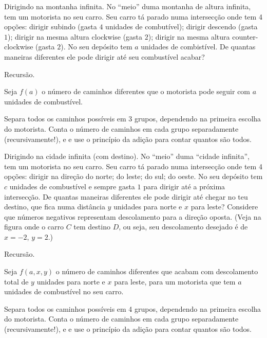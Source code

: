 \exercise Dirigindo na montanha infinita.
\label{infinite_mountain}
No ``meio'' duma montanha de altura infinita, tem um motorista no seu carro.
Seu carro tá parado numa intersecção onde tem 4 opções:
dirigir subindo (gasta $4$ unidades de combutível);
dirigir descendo (gasta $1$);
dirigir na mesma altura clockwise (gasta $2$);
dirigir na mesma altura counter-clockwise (gasta $2$).
No seu depósito tem $a$ unidades de combistível.
De quantas maneiras diferentes ele pode dirigir até seu combustível acabar?

\hint
Recursão.

\hint
Seja $f(a)$ o número de caminhos diferentes que o motorista pode seguir com $a$ unidades de combustível.

\hint
Separa todos os caminhos possíveis em 3 grupos, dependendo na primeira escolha do motorista.
Conta o número de caminhos em cada grupo separadamente (recursivamente!),
e e use o princípio da adição para contar quantos são todos.

\endexercise

\exercise Dirigindo na cidade infinita (com destino).
\label{infinite_city_2}
No ``meio'' duma ``cidade infinita'', tem um motorista no seu carro.
Seu carro tá parado numa intersecção onde tem 4 opções:
dirigir na direção do norte; do leste; do sul; do oeste.
No seu depósito tem $c$ unidades de combustível
e sempre gasta $1$ para dirigir até a próxima intersecção.
De quantas maneiras diferentes ele pode dirigir até chegar no teu destino,
que fica numa distância $y$ unidades para norte e $x$ para leste?
Considere que números negativos representam descolamento para a direção oposta.
(Veja na figura onde o carro $C$ tem destino $D$, ou seja, seu descolamento
desejado é de $x=-2$, $y=2$.)

\hint
Recursão.

\hint
Seja $f(a,x,y)$ o número de caminhos diferentes que acabam com descolamento total de $y$ unidades para norte e $x$ para leste, para um motorista que tem $a$ unidades de combustível no seu carro.

\hint
Separa todos os caminhos possíveis em 4 grupos, dependendo na primeira escolha do motorista.
Conta o número de caminhos em cada grupo separadamente (recursivamente!),
e e use o princípio da adição para contar quantos são todos.


